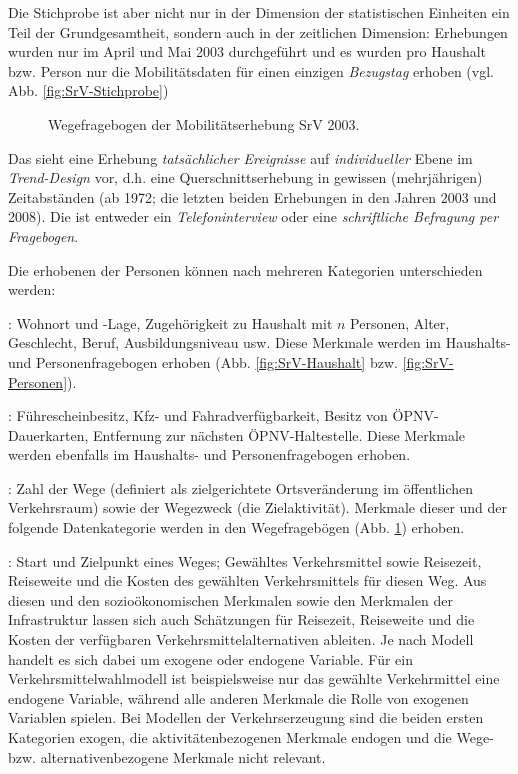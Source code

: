 Die Stichprobe ist aber nicht nur in der Dimension der statistischen
Einheiten ein Teil der Grund\-gesamtheit, sondern auch in der zeitlichen
Dimension: Erhebungen wurden nur im April und Mai 2003 durch\-gef\"uhrt
und es wurden pro Haushalt bzw. Person  nur die Mobilit\"atsdaten f\"ur
einen einzigen \textit{Bezugstag} erhoben (vgl. Abb. \ref{fig:SrV-Stichprobe})


\begin{figure}
\caption{\label{fig:SrV-Wege}Wegefragebogen der
Mobilit\"atserhebung SrV 2003.
}
\end{figure}

Das  sieht eine Erhebung
\textit{tats\"achlicher Ereignisse} auf \textit{individueller}
Ebene im \textit{Trend-Design} vor, d.h. eine Querschnittserhebung in
gewissen (mehrj\"ahrigen) Zeitabst\"anden (ab 1972; die letzten beiden
Erhebungen in den Jahren 2003 und 2008).
Die  ist entweder ein
\textit{Telefoninterview} oder eine \textit{schriftliche Befragung per
Fragebogen}.

Die erhobenen  der Personen k\"onnen nach mehreren Kategorien
unterschieden werden:
\bi
\item {}: Wohnort und -Lage, Zugeh\"origkeit zu Haushalt mit  $n$ Personen, 
Alter, Ge\-schlecht, Beruf, Ausbildungsniveau usw. Diese Merkmale werden
im Haushalts- und Personenfragebogen erhoben
(Abb. \ref{fig:SrV-Haushalt} bzw. \ref{fig:SrV-Personen}).
\item {}:
F\"uhrescheinbesitz, Kfz- und Fahradverf\"ugbarkeit, Besitz von
\"OPNV-Dauerkarten, Entfernung zur n\"achsten \"OPNV-Haltestelle. 
Diese Merkmale werden
ebenfalls im Haushalts- und Personenfragebogen erhoben.
\item {}: Zahl der Wege
(definiert als zielgerichtete Ortsver\"anderung im \"offentlichen
Verkehrsraum) sowie der
Wegezweck (die Zielaktivit\"at). Merkmale dieser und der folgende
Datenkategorie werden in den Wegefrageb\"ogen (Abb. \ref{fig:SrV-Wege})
erhoben.
\item {}: Start und
Zielpunkt eines Weges; Gew\"ahltes
Verkehrsmittel sowie Reisezeit, Reiseweite und die Kosten des gew\"ahlten
Verkehrsmittels f\"ur diesen Weg. Aus diesen und den sozio\"okonomischen
Merkmalen sowie den Merkmalen der Infrastruktur  
lassen sich auch Sch\"atzungen f\"ur Reisezeit, Reiseweite und
die Kosten der verf\"ugbaren Verkehrsmittelalternativen ableiten.
\ei
Je nach Modell handelt es sich dabei um exogene oder endogene
Variable. F\"ur ein Verkehrsmittelwahlmodell ist beispielsweise nur das gew\"ahlte
Verkehrmittel eine endogene Variable, w\"ahrend alle anderen Merkmale
die Rolle von exogenen Variablen spielen.
Bei Modellen  der Verkehrserzeugung  sind die beiden ersten
Kategorien exogen, die  aktivit\"atenbezogenen Merkmale  endogen und
die Wege- bzw. alternativenbezogene Merkmale nicht relevant.

